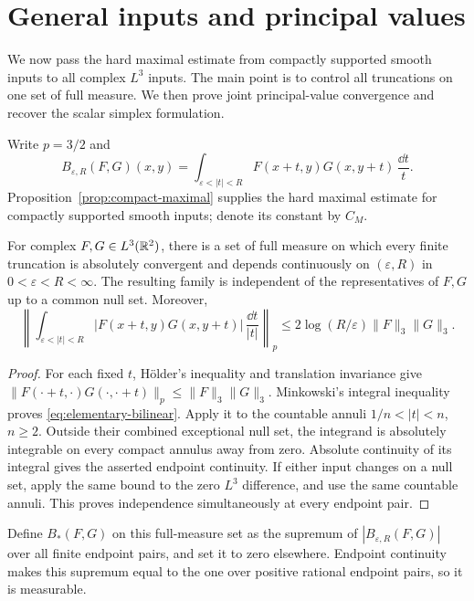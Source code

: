 \section{General inputs and principal values}\label{sec:consequences}

We now pass the hard maximal estimate from compactly supported smooth
inputs to all complex $L^3$ inputs.  The main point is to control all
truncations on one set of full measure.  We then prove joint principal-value
convergence and recover the scalar simplex formulation.

Write $p=3/2$ and
\[
 B_{\varepsilon,R}(F,G)(x,y)
 =\int_{\varepsilon<|t|<R}F(x+t,y)G(x,y+t)\,\frac{\dd t}{t}.
\]
Proposition~\ref{prop:compact-maximal} supplies the hard maximal estimate
for compactly supported smooth inputs; denote its constant by $C_M$.

\begin{lemma}\label{lem:finite-truncations}
For complex $F,G\in L^3(\mathbb R^2)$, there is a set of full measure on which
every finite truncation is absolutely convergent and depends continuously
on $(\varepsilon,R)$ in $0<\varepsilon<R<\infty$.
The resulting family is independent of the representatives of $F,G$ up
to a common null set.  Moreover,
\begin{equation}\label{eq:elementary-bilinear}
 \left\|\int_{\varepsilon<|t|<R}
 |F(x+t,y)G(x,y+t)|\,\frac{\dd t}{|t|}\right\|_p
 \le 2\log(R/\varepsilon)\|F\|_3\|G\|_3.
\end{equation}
\end{lemma}

\begin{proof}
For each fixed $t$, H\"older's inequality and translation invariance give
$\|F(\cdot+t,\cdot)G(\cdot,\cdot+t)\|_p\le\|F\|_3\|G\|_3$.
Minkowski's integral inequality proves
\eqref{eq:elementary-bilinear}.  Apply it to the countable annuli
$1/n<|t|<n$, $n\ge2$.  Outside their combined exceptional null set,
the integrand is absolutely integrable on every compact annulus away
from zero.  Absolute continuity of its integral gives the asserted
endpoint continuity.  If either input changes on a null set, apply the
same bound to the zero $L^3$ difference, and use the same countable
annuli.  This proves independence simultaneously at every endpoint pair.
\end{proof}

Define $B_*(F,G)$ on this full-measure set as the supremum of
$|B_{\varepsilon,R}(F,G)|$ over all finite endpoint pairs, and set it to
zero elsewhere.  Endpoint continuity makes this supremum equal to the
one over positive rational endpoint pairs, so it is measurable.

